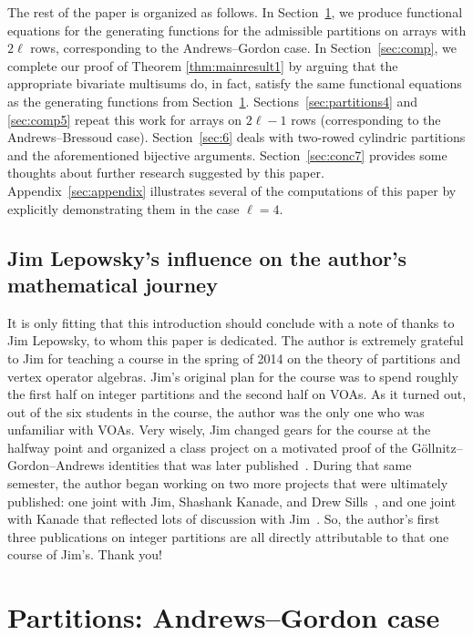 \documentclass[pdftex]{sigma}
\numberwithin{equation}{section}
\theoremstyle{definition}
\begin{document}
The rest of the paper is organized as follows. In Section~\ref{sec:partitions2}, we produce functional equations for the generating functions for the admissible partitions on arrays with $2\ell$ rows, corresponding to the Andrews--Gordon case. In Section~\ref{sec:comp}, we complete our proof of Theorem \ref{thm:mainresult1} by arguing that the appropriate bivariate multisums do, in fact, satisfy the same functional equations as the generating functions from Section~\ref{sec:partitions2}. Sections~\ref{sec:partitions4} and \ref{sec:comp5} repeat this work for arrays on $2\ell-1$ rows (corresponding to the Andrews--Bressoud case). Section~\ref{sec:6} deals with two-rowed cylindric partitions and the aforementioned bijective arguments. Section~\ref{sec:conc7} provides some thoughts about further research suggested by this paper. Appendix~\ref{sec:appendix} illustrates several of the computations of this paper by explicitly demonstrating them in the case $\ell=4$.

\subsection{Jim Lepowsky's influence on the author's mathematical journey}

It is only fitting that this introduction should conclude with a note of thanks to Jim Lepowsky, to whom this paper is dedicated. The author is extremely grateful to Jim for teaching a course in the spring of 2014 on the theory of partitions and vertex operator algebras. Jim's original plan for the course was to spend roughly the first half on integer partitions and the second half on VOAs. As it turned out, out of the six students in the course, the author was the only one who was unfamiliar with VOAs. Very wisely, Jim changed gears for the course at the halfway point and organized a class project on a motivated proof of the G\"ollnitz--Gordon--Andrews identities that was later published~\cite{CKLMQRS}. During that same semester, the author began working on two more projects that were ultimately published: one joint with Jim, Shashank Kanade, and Drew Sills~\cite{KLRS}, and one joint with Kanade that reflected lots of discussion with Jim~\cite{KanRus-idf}. So, the author's first three publications on integer partitions are all directly attributable to that one course of Jim's. Thank you!

\section{Partitions: Andrews--Gordon case}\label{sec:partitions2}
\end{document}

